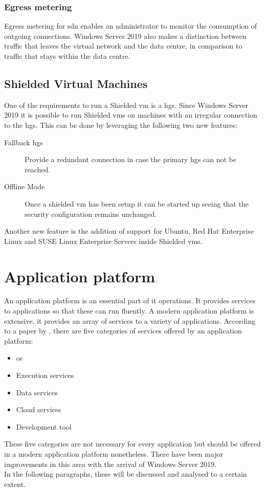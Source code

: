 \subsubsection{Egress metering}
Egress metering for \acrshort{sdn} enables an administrator to monitor the consumption of outgoing connections. Windows Server 2019 also makes a distinction between traffic that leaves the virtual network and the data centre, in comparison to traffic that stays within the data centre. 

\subsection{Shielded Virtual Machines}
One of the requirements to run a Shielded \acrshort{vm} is a \acrfull{hgs}. Since Windows Server 2019 it is possible to run Shielded \acrshort{vm}s on machines with an irregular connection to the \acrshort{hgs}. This can be done by leveraging the following two new features:

\begin{description}
	\item[Fallback \acrshort{hgs}] Provide a redundant connection in case the primary \acrshort{hgs} can not be reached.
	\item[Offline Mode] Once a shielded \acrshort{vm} has been setup it can be started up seeing that the security configuration remains unchanged.
\end{description}

Another new feature is the addition of support for Ubuntu, Red Hat Enterprise Linux and SUSE Linux Enterprise Servers inside Shielded \acrshort{vm}s. 

\clearpage

\section{Application platform}
An application platform is an essential part of \acrshort{it} operations. It provides services to applications so that these can run fluently. A modern application platform is extensive, it provides an array of services to a variety of applications. According to a paper by \textcite{Chappell2011}, there are five categories of services offered by an application platform:
\begin{itemize}
	\item \acrshort{os}
	\item Execution services
	\item Data services
	\item Cloud services
	\item Development tool
\end{itemize}
These five categories are not necessary for every application but should be offered in a modern application platform nonetheless.
There have been major improvements in this area with the arrival of Windows Server 2019.\autocite{Gerend2018} 
\\
In the following paragraphs, these will be discussed and analysed to a certain extent.

